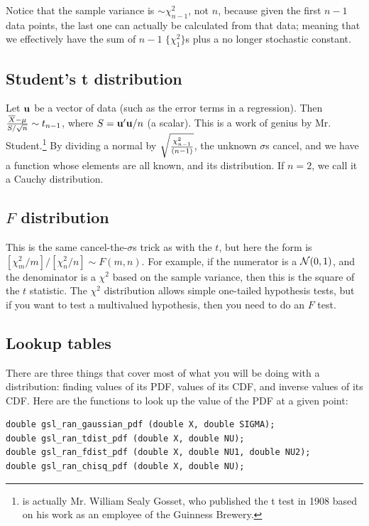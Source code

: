 Notice that the sample variance is $\sim
\chi^2_{n-1}$, not $n$, because given the first $n-1$ data points, the
last one can actually be calculated from that data; meaning that we
effectively have the sum of $n-1$ $\{\chi^2_1\}$s plus a no longer
stochastic constant.

\subsection{Student's t distribution} Let ${\bf u}$ be
a vector of data (such as the error terms in a regression). Then
${\overline X - \mu \over S/\sqrt{n}}\sim
t_{n-1}$, where $S={\bf u}'{\bf u}/n$ (a scalar). This is a work of genius by
Mr. Student.\footnote{ is actually Mr. William Sealy
Gosset, who published the t test in 1908 based on his work as an employee
of the Guinness Brewery.  }
By dividing a normal by $\sqrt{\chi^2_{n-1}\over (n-1)}$, the unknown
$\sigma$s cancel, and we have a function whose elements are all known,
and its distribution.  If $n=2$, we call it a Cauchy distribution.
\label{tstat}


\subsection{$F$ distribution}  This is the same cancel-the-$\sigma$s trick as with the $t$, but here the form
is $[\chi^2_m/m]/[\chi^2_n/n]\sim F(m,n)$. For example, if the numerator
is a ${\cal N}(0,1)$, and the denominator is a $\chi^2$ based on the
sample variance, then this is the square of the $t$ statistic.
The $\chi^2$ distribution 
allows simple one-tailed hypothesis tests, but if you want to test a
multivalued hypothesis, then you need to do an $F$ test.

\subsection{Lookup tables}
There are three things that cover most of what you will be doing with a
distribution: finding values of its PDF, values of its CDF, and inverse
values of its CDF.
Here are the functions to look up the value of the PDF at a given point:

\begin{lstlisting}
double gsl_ran_gaussian_pdf (double X, double SIGMA);
double gsl_ran_tdist_pdf (double X, double NU);
double gsl_ran_fdist_pdf (double X, double NU1, double NU2);
double gsl_ran_chisq_pdf (double X, double NU);
\end{lstlisting}

